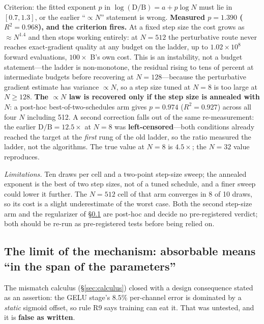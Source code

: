 \documentclass[11pt]{article}
\begin{document}
Criterion: the fitted exponent $p$ in $\log(\mathrm{D/B}) = a + p\log N$ must lie in $[0.7, 1.3]$, or the earlier ``$\propto N$'' statement is wrong. \textbf{Measured $p = 1.390$ ($R^2 = 0.968$), and the criterion fires.} At a fixed step size the cost grows as ${\approx}N^{1.4}$ and then stops working entirely: at $N = 512$ the perturbative route never reaches exact-gradient quality at any budget on the ladder, up to $1.02\times10^8$ forward evaluations, $100\times$ B's own cost. This is an instability, not a budget statement---the ladder is non-monotone, the residual rising to tens of percent at intermediate budgets before recovering at $N=128$---because the perturbative gradient estimate has variance $\propto N$, so a step size tuned at $N = 8$ is too large at $N \ge 128$. \textbf{The $\propto N$ law is recovered only if the step size is annealed with $N$}: a post-hoc best-of-two-schedules arm gives $p = \mathbf{0.974}$ ($R^2 = 0.927$) across all four $N$ including 512. A second correction falls out of the same re-measurement: the earlier $\mathrm{D/B} = 12.5\times$ at $N = 8$ was \textbf{left-censored}---both conditions already reached the target at the \textit{first} rung of the old ladder, so the ratio measured the ladder, not the algorithms. The true value at $N=8$ is $\mathbf{4.5\times}$; the $N=32$ value reproduces.

\textit{Limitations.} Ten draws per cell and a two-point step-size sweep; the annealed exponent is the best of two step sizes, not of a tuned schedule, and a finer sweep could lower it further. The $N=512$ cell of that arm converges in 8 of 10 draws, so its cost is a slight underestimate of the worst case. Both the second step-size arm and the regularizer of \S\ref{sec:gelulimit} are post-hoc and decide no pre-registered verdict; both should be re-run as pre-registered tests before being relied on.

\subsection{The limit of the mechanism: absorbable means ``in the span of the parameters''}
\label{sec:gelulimit}

The mismatch calculus (\S\ref{sec:calculus}) closed with a design consequence stated as an assertion: the GELU stage's $8.5\%$ per-channel error is dominated by a \textit{static} sigmoid offset, so rule R9 says training can eat it. That was untested, and it is \textbf{false as written}.
\end{document}
